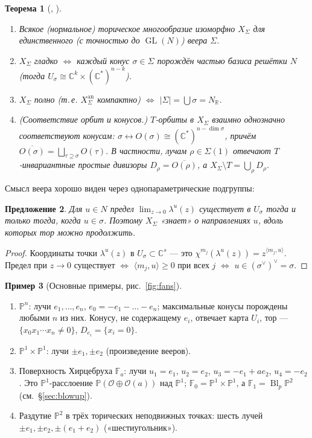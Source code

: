 \documentclass[11pt,a4paper]{article}
\theoremstyle{plain}
\newtheorem{theorem}{Теорема}[section]
\newtheorem{proposition}[theorem]{Предложение}
\theoremstyle{definition}
\newtheorem{example}[theorem]{Пример}
\theoremstyle{remark}
\renewcommand{\C}{\mathbb{C}}
\newcommand{\R}{\mathbb{R}}
\newcommand{\PP}{\mathbb{P}}
\newcommand{\cO}{\mathcal{O}}
\DeclareMathOperator{\Bl}{Bl}
\DeclareMathOperator{\GL}{GL}
\newcommand{\an}{\mathrm{an}}
\begin{document}
\begin{theorem}[{\cite[3.1]{CLS}, \cite[1.4]{Fu}}]\label{thm:toric-basic}
\begin{enumerate}
\item Всякое (нормальное) торическое многообразие изоморфно $X_\Sigma$ для единственного
(с точностью до $\GL(N)$) веера $\Sigma$.
\item $X_\Sigma$ гладко $\iff$ каждый конус $\sigma\in\Sigma$ порождён частью базиса решётки $N$
(тогда $U_\sigma\cong\C^k\times(\C^*)^{n-k}$).
\item $X_\Sigma$ полно (т.\,е. $X^{\an}_\Sigma$ компактно) $\iff$ $|\Sigma|=\bigcup\sigma=N_\R$.
\item (\emph{Соответствие орбит и конусов.}) $T$-орбиты в $X_\Sigma$ взаимно однозначно
соответствуют конусам: $\sigma\leftrightarrow O(\sigma)\cong(\C^*)^{n-\dim\sigma}$, причём
$\overline{O(\sigma)}=\bigsqcup_{\tau\supseteq\sigma}O(\tau)$. В частности, лучам
$\rho\in\Sigma(1)$ отвечают $T$-инвариантные простые дивизоры $D_\rho=\overline{O(\rho)}$, а
$X_\Sigma\setminus T=\bigcup_\rho D_\rho$.
\end{enumerate}
\end{theorem}

Смысл веера хорошо виден через однопараметрические подгруппы:

\begin{proposition}
Для $u\in N$ предел $\lim_{z\to0}\lambda^u(z)$ существует в $U_\sigma$ тогда и только тогда, когда
$u\in\sigma$. Поэтому $X_\Sigma$ «знает» о направлениях $u$, вдоль которых тор можно продолжить.
\end{proposition}
\begin{proof}
Координаты точки $\lambda^u(z)$ в $U_\sigma\subset\C^s$ --- это $\chi^{m_j}(\lambda^u(z))=
z^{\langle m_j,u\rangle}$. Предел при $z\to0$ существует $\iff$ $\langle m_j,u\rangle\ge0$ при всех
$j$ $\iff$ $u\in(\sigma^\vee)^\vee=\sigma$.
\end{proof}

\begin{example}[Основные примеры, рис.~\ref{fig:fans}]\label{ex:fans}
\begin{enumerate}
\item $\PP^n$: лучи $e_1,\dots,e_n$, $e_0=-e_1-\dots-e_n$; максимальные конусы порождены любыми
$n$ из них. Конусу, не содержащему $e_i$, отвечает карта $U_i$, тор --- $\{x_0x_1\cdots x_n\ne0\}$,
$D_{e_i}=\{x_i=0\}$.
\item $\PP^1\times\PP^1$: лучи $\pm e_1,\pm e_2$ (произведение вееров).
\item Поверхность Хирцебруха $\mathbb F_a$: лучи $u_1=e_1$, $u_2=e_2$, $u_3=-e_1+ae_2$,
$u_4=-e_2$. Это $\PP^1$-расслоение $\PP(\cO\oplus\cO(a))$ над $\PP^1$; $\mathbb F_0=\PP^1\times\PP^1$,
а $\mathbb F_1=\Bl_p\PP^2$ (см.~\S\ref{sec:blowup}).
\item Раздутие $\PP^2$ в трёх торических неподвижных точках: шесть лучей
$\pm e_1,\pm e_2,\pm(e_1+e_2)$ («шестиугольник»).
\end{enumerate}
\end{example}
\end{document}
